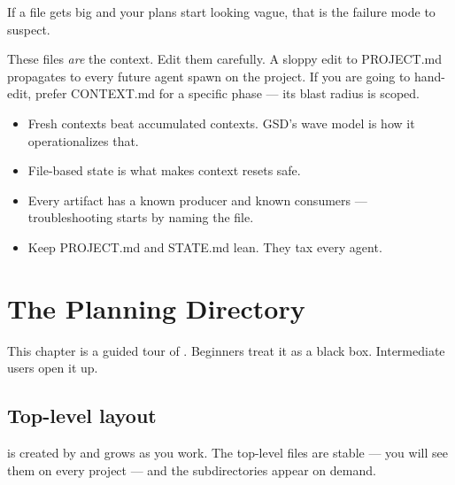 \documentclass[11pt,letterpaper,openany]{book}
\begin{document}
If a file gets big and your plans start looking vague, that is the failure mode to suspect.

\begin{gsdimportant}
These files \emph{are} the context. Edit them carefully. A sloppy edit to PROJECT.md propagates to every future agent spawn on the project. If you are going to hand-edit, prefer CONTEXT.md for a specific phase --- its blast radius is scoped.
\end{gsdimportant}

\begin{gsdnote}[title=Key Takeaways]
\begin{itemize}[itemsep=2pt,leftmargin=1.2em]
  \item Fresh contexts beat accumulated contexts. GSD's wave model is how it operationalizes that.
  \item File-based state is what makes context resets safe.
  \item Every artifact has a known producer and known consumers --- troubleshooting starts by naming the file.
  \item Keep PROJECT.md and STATE.md lean. They tax every agent.
\end{itemize}
\end{gsdnote}

\chapter{The Planning Directory}

This chapter is a guided tour of . Beginners treat it as a black box. Intermediate users open it up.

\section{Top-level layout}

 is created by  and grows as you work. The top-level files are stable --- you will see them on every project --- and the subdirectories appear on demand.
\end{document}
